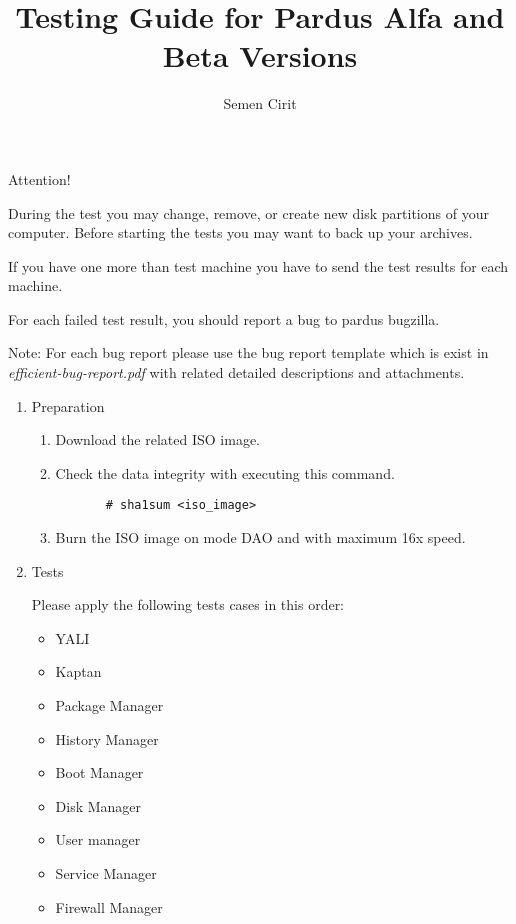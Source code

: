 \documentclass[a4paper,10pt]{article}
\title{Testing Guide for Pardus Alfa and Beta Versions}
\author{Semen Cirit}
\begin{document}
\maketitle

Attention!

    During the test you may change, remove, or create new disk partitions of your computer. 
    Before starting the tests you may want to back up your archives.
    
    
    If you have one more than test machine you have to send the test results for each machine.

    For each failed test result, you should report a bug to pardus bugzilla.

    Note: For each bug report please use the bug report template which is exist in \emph{efficient-bug-report.pdf} with related detailed descriptions and attachments. 

\begin{enumerate}
\item Preparation
  \begin{enumerate}
    \item Download the related ISO image.
    \item Check the data integrity with executing this command.
      \begin{verbatim}
       # sha1sum <iso_image>
      \end{verbatim}
    \item Burn the ISO image on mode DAO and with maximum 16x speed.
  \end{enumerate}
  \item Tests
    
    Please apply the following tests cases in this order:
    \begin{itemize}
    \item YALI
    \item Kaptan
    \item Package Manager
    \item History Manager
    \item Boot Manager
    \item Disk Manager
    \item User manager
    \item Service Manager
    \item Firewall Manager
    \end{itemize}
 \end{enumerate}
\end{document}
